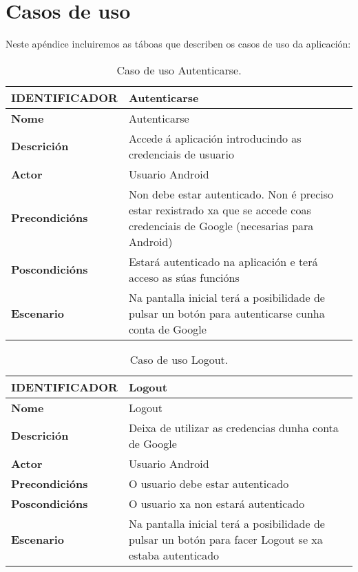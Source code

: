 \chapter{Casos de uso}

Neste apéndice incluiremos as táboas que describen os casos de uso da aplicación:

\begin{table} [tbh]
	\footnotesize
	\centering
	\begin{tabular}{|l|p{10cm}|}
		\hline 
		\textbf{IDENTIFICADOR}	& \textbf{Autenticarse} \\ 
		\hline 
		\textbf{Nome} & Autenticarse \\ 
		\hline 
		\textbf{Descrición} & Accede á aplicación introducindo as credenciais de usuario \\ 
		\hline 
		\textbf{Actor} & Usuario Android \\ 
		\hline 
		\textbf{Precondicións} & Non debe estar autenticado. Non é preciso estar rexistrado xa que se accede coas credenciais de Google (necesarias para Android) \\ 
		\hline 
		\textbf{Poscondicións} & Estará autenticado na aplicación e terá acceso as súas funcións \\ 
		\hline 
		\textbf{Escenario} & Na pantalla inicial terá a posibilidade de pulsar un botón para autenticarse cunha conta de Google \\ 
		\hline 
	\end{tabular}
	\caption{Caso de uso Autenticarse.}
	\label{tab:cuAutenticar}
\end{table}

\begin{table} [tbh]
	\footnotesize
	\centering
	\begin{tabular}{|l|p{10cm}|}
		\hline 
		\textbf{IDENTIFICADOR}	& \textbf{Logout} \\ 
		\hline 
		\textbf{Nome} & Logout \\ 
		\hline 
		\textbf{Descrición} & Deixa de utilizar as credencias dunha conta de Google \\ 
		\hline 
		\textbf{Actor} & Usuario Android \\ 
		\hline 
		\textbf{Precondicións} & O usuario debe estar autenticado \\ 
		\hline 
		\textbf{Poscondicións} & O usuario xa non estará autenticado \\ 
		\hline 
		\textbf{Escenario} & Na pantalla inicial terá a posibilidade de pulsar un botón para facer Logout se xa estaba autenticado \\ 
		\hline 
	\end{tabular}
	\caption{Caso de uso Logout.}
	\label{tab:cuLogout}
\end{table}

